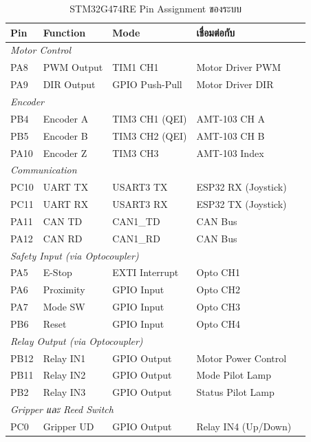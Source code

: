 \begin{table}[H]
  \centering
  \caption{STM32G474RE Pin Assignment ของระบบ}
  \label{tab:pin_assignment}
  \begin{tabular}{lllll}
    \toprule
    Pin & Function & Mode & เชื่อมต่อกับ \\
    \midrule
    \multicolumn{4}{l}{\textit{Motor Control}} \\
    PA8 & PWM Output & TIM1 CH1         & Motor Driver PWM \\
    PA9 & DIR Output & GPIO Push-Pull    & Motor Driver DIR \\
    \midrule
    \multicolumn{4}{l}{\textit{Encoder}} \\
    PB4 & Encoder A  & TIM3 CH1 (QEI)   & AMT-103 CH A \\
    PB5 & Encoder B  & TIM3 CH2 (QEI)   & AMT-103 CH B \\
    PA10& Encoder Z  & TIM3 CH3         & AMT-103 Index \\
    \midrule
    \multicolumn{4}{l}{\textit{Communication}} \\
    PC10& UART TX    & USART3 TX        & ESP32 RX (Joystick) \\
    PC11& UART RX    & USART3 RX        & ESP32 TX (Joystick) \\
    PA11& CAN TD     & CAN1\_TD         & CAN Bus \\
    PA12& CAN RD     & CAN1\_RD         & CAN Bus \\
    \midrule
    \multicolumn{4}{l}{\textit{Safety Input (via Optocoupler)}} \\
    PA5 & E-Stop     & EXTI Interrupt   & Opto CH1 \\
    PA6 & Proximity  & GPIO Input       & Opto CH2 \\
    PA7 & Mode SW    & GPIO Input       & Opto CH3 \\
    PB6 & Reset      & GPIO Input       & Opto CH4 \\
    \midrule
    \multicolumn{4}{l}{\textit{Relay Output (via Optocoupler)}} \\
    PB12& Relay IN1  & GPIO Output      & Motor Power Control \\
    PB11& Relay IN2  & GPIO Output      & Mode Pilot Lamp \\
    PB2 & Relay IN3  & GPIO Output      & Status Pilot Lamp \\
    \midrule
    \multicolumn{4}{l}{\textit{Gripper และ Reed Switch}} \\
    PC0 & Gripper UD & GPIO Output      & Relay IN4 (Up/Down) \\

\end{tabular}
\end{table}
